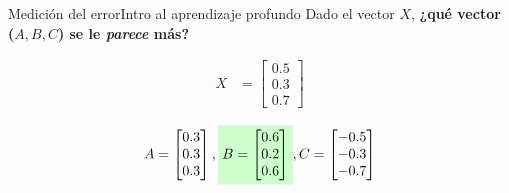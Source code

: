 \documentclass[10pt,border=3pt,tikz]{beamer}
\begin{document}
    \begin{frame}{Medición del error}{Intro al aprendizaje profundo}
        Dado el vector $X$, \textbf{¿qué vector ($A, B, C$) se le \textit{parece} más?}
        
        \begin{align*}
            X &= \begin{bmatrix}
                0.5 \\
                0.3 \\
                0.7
            \end{bmatrix}
        \end{align*}
        
        \begin{align*}
            A = \begin{bmatrix}
                0.3 \\
                0.3 \\
                0.3
            \end{bmatrix},
            \colorbox{green!20}{$B = \begin{bmatrix}
                0.6 \\
                0.2 \\
                0.6
            \end{bmatrix}$},
            C = \begin{bmatrix}
                -0.5 \\
                -0.3 \\
                -0.7
            \end{bmatrix}
        \end{align*}
    \end{frame}
    
\end{document}
